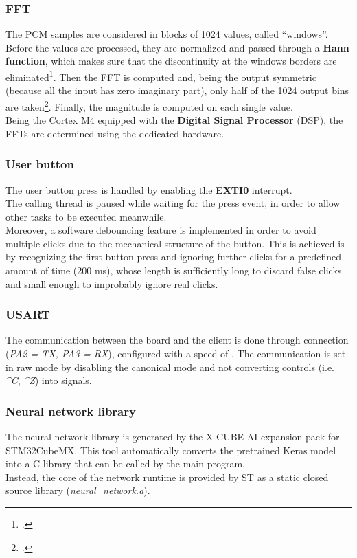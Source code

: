 \documentclass[12pt]{article}
\begin{document}
\subsubsection{FFT}
The PCM samples are considered in blocks of 1024 values, called ``windows''. Before the values are processed, they are normalized and passed through a \textbf{Hann function}, which makes sure that the discontinuity at the windows borders are eliminated\footcite{engelberg2008digital}. Then the FFT is computed and, being the output symmetric (because all the input has zero imaginary part), only half of the 1024 output bins are taken\footcite{parker2017digital}. Finally, the magnitude is computed on each single value.\\
Being the Cortex M4 equipped with the \textbf{Digital Signal Processor} (DSP), the FFTs are determined using the dedicated hardware.

\subsubsection{User button}
The user button press is handled by enabling the \textbf{EXTI0} interrupt.\\
The calling thread is paused while waiting for the press event, in order to allow other tasks to be executed meanwhile.\\
Moreover, a software debouncing feature is implemented in order to avoid multiple clicks due to the mechanical structure of the button. This is achieved is by recognizing the first button press and ignoring further clicks for a predefined amount of time (200 ms), whose length is sufficiently long to discard false clicks and small enough to improbably ignore real clicks.

\subsubsection{USART}
The communication between the board and the client is done through  connection (\textit{PA2 = TX, PA3 = RX}), configured with a speed of . The communication is set in raw mode by disabling the canonical mode and not converting controls (i.e. \textit{\^{}C}, \textit{\^{}Z}) into signals.

\subsubsection{Neural network library}
The neural network library is generated by the X-CUBE-AI expansion pack for STM32CubeMX. This tool automatically converts the pretrained Keras model into a C library that can be called by the main program.\\
Instead, the core of the network runtime is provided by ST as a static closed source library (\textit{neural\_network.a}).
\end{document}
